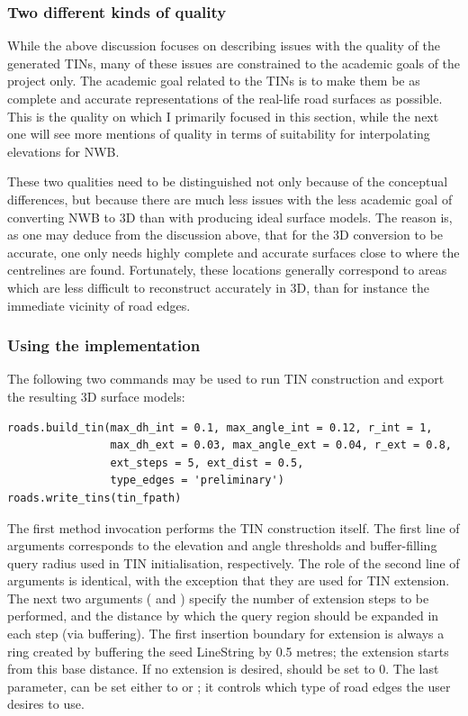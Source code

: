 \subsubsection{Two different kinds of quality}

While the above discussion focuses on describing issues with the quality of the generated TINs, many of these issues are constrained to the academic goals of the project only. The academic goal related to the TINs is to make them be as complete and accurate representations of the real-life road surfaces as possible. This is the quality on which I primarily focused in this section, while the next one will see more mentions of quality in terms of suitability for interpolating elevations for NWB.

These two qualities need to be distinguished not only because of the conceptual differences, but because there are much less issues with the less academic goal of converting NWB to 3D than with producing ideal surface models. The reason is, as one may deduce from the discussion above, that for the 3D conversion to be accurate, one only needs highly complete and accurate surfaces close to where the centrelines are found. Fortunately, these locations generally correspond to areas which are less difficult to reconstruct accurately in 3D, than for instance the immediate vicinity of road edges.

\subsubsection{Using the implementation}

The following two commands may be used to run TIN construction and export the resulting 3D surface models:

\begin{lstlisting}
roads.build_tin(max_dh_int = 0.1, max_angle_int = 0.12, r_int = 1,
                max_dh_ext = 0.03, max_angle_ext = 0.04, r_ext = 0.8,
                ext_steps = 5, ext_dist = 0.5,
                type_edges = 'preliminary')
roads.write_tins(tin_fpath)
\end{lstlisting}

The first method invocation performs the TIN construction itself. The first line of arguments corresponds to the elevation and angle thresholds and buffer-filling query radius used in TIN initialisation, respectively. The role of the second line of arguments is identical, with the exception that they are used for TIN extension. The next two arguments ( and ) specify the number of extension steps to be performed, and the distance by which the query region should be expanded in each step (via buffering). The first insertion boundary for extension is always a ring created by buffering the seed LineString by 0.5 metres; the extension starts from this base distance. If no extension is desired,  should be set to 0. The last parameter,  can be set either to  or ; it controls which type of road edges the user desires to use.

